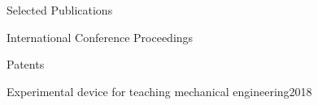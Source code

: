\begin{rSection}{Selected Publications}

\begin{pubSubsectionNum}{International Conference Proceedings}
	\item {}
\end{pubSubsectionNum}
\begin{pubSubsectionNum}{Patents}
	\item {Experimental device for teaching mechanical engineering}\hfill{2018}
\end{pubSubsectionNum}

\end{rSection}
